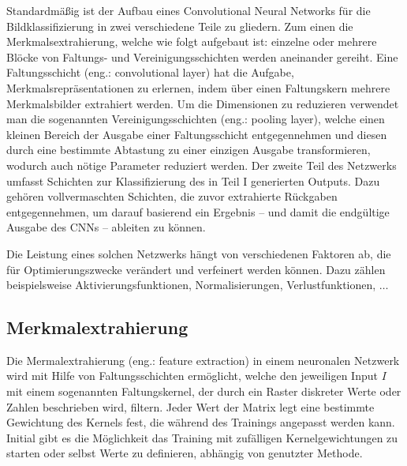 Standardmäßig ist der Aufbau eines Convolutional Neural Networks für die Bildklassifizierung in zwei verschiedene Teile zu gliedern. Zum einen die Merkmalsextrahierung, welche wie folgt aufgebaut ist: einzelne oder mehrere Blöcke von Faltungs- und Vereinigungsschichten werden aneinander gereiht. Eine Faltungsschicht (eng.: convolutional layer) hat die Aufgabe, Merkmalsrepräsentationen zu erlernen, indem über einen Faltungskern mehrere Merkmalsbilder extrahiert werden. Um die Dimensionen zu reduzieren verwendet man die sogenannten Vereinigungsschichten (eng.: pooling layer), welche einen kleinen Bereich der Ausgabe einer Faltungsschicht entgegennehmen und diesen durch eine bestimmte Abtastung zu einer einzigen Ausgabe transformieren, wodurch auch nötige Parameter reduziert werden. Der zweite Teil des Netzwerks umfasst Schichten zur Klassifizierung des in Teil I generierten Outputs. Dazu gehören vollvermaschten Schichten, die zuvor extrahierte Rückgaben entgegennehmen, um darauf basierend ein Ergebnis -- und damit die endgültige Ausgabe des CNNs -- ableiten zu können.

Die Leistung eines solchen Netzwerks hängt von verschiedenen Faktoren ab, die für Optimierungszwecke verändert und verfeinert werden können. Dazu zählen beispielsweise Aktivierungsfunktionen, Normalisierungen, Verlustfunktionen, $\ldots$
\subsection{Merkmalextrahierung}
Die Mermalextrahierung (eng.: feature extraction) in einem neuronalen Netzwerk wird mit Hilfe von Faltungsschichten ermöglicht, welche den jeweiligen Input $I$ mit einem sogenannten Faltungskernel, der durch ein Raster diskreter Werte oder Zahlen beschrieben wird, filtern. Jeder Wert der Matrix legt eine bestimmte Gewichtung des Kernels fest, die während des Trainings angepasst werden kann. Initial gibt es die Möglichkeit das Training mit zufälligen Kernelgewichtungen zu starten oder selbst Werte zu definieren, abhängig von genutzter Methode.

